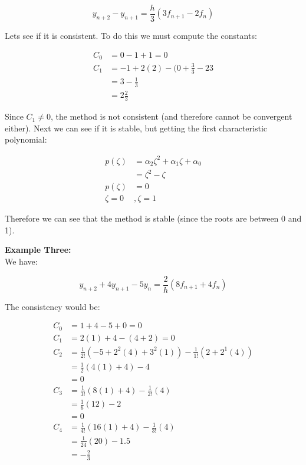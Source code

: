 \begin{description}
\[
  y_{n+2} - y_{n+1} = \frac{h}{3}(3f_{n+1} - 2f_n)
\]

Lets see if it is consistent. To do this we must compute the
constants:

\[
  \begin{split}
    C_0 &= 0 - 1 + 1 = 0\\
    C_1 &= -1 + 2(2) - (0 + \frac{3}{3} - {2}{3}\\
        &= 3 - \frac{1}{3}\\
        &= 2\frac{2}{3}
  \end{split}
\]

Since $C_1 \neq 0$, the method is not consistent (and therefore cannot
be convergent either). Next we can see if it is stable, but getting
the first characteristic polynomial:

\[
\begin{split}
  p(\zeta) &= \alpha_2\zeta^2 + \alpha_1\zeta + \alpha_0\\
           &= \zeta^2 - \zeta\\
  p(\zeta) &= 0\\
  \zeta = 0&, \zeta = 1
\end{split}
\]

Therefore we can see that the method is stable (since the roots are
between 0 and 1).

\item \textbf{Example Three:}\\

We have:

\[
  y_{n+2} + 4y_{n+1} - 5y_n = \frac{2}{h}(8f_{n+1} + 4f_n)
\]

The consistency would be:

\[
\begin{split}
  C_0 &= 1 + 4 - 5 + 0 = 0\\
  C_1 &= 2(1) + 4 - (4 + 2) = 0\\
  C_2 &= \frac{1}{2!}(-5 + 2^2(4) + 3^2(1)) - \frac{1}{1!}(2 +
  2^1(4))\\
      &= \frac{1}{2}(4(1) + 4) - 4\\
      &= 0\\
  C_3 &= \frac{1}{3!}(8(1) + 4) - \frac{1}{2!}(4)\\
      &= \frac{1}{6}(12) - 2\\
      &= 0\\
  C_4 &= \frac{1}{4!}(16(1) + 4) - \frac{1}{3!}(4)\\
      &= \frac{1}{24}(20) - 1.5\\
      &= -\frac{2}{3}
\end{split}
\]


\end{description}
